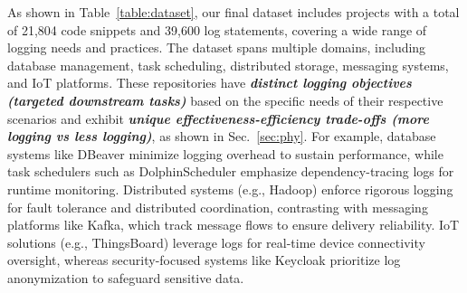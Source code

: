 As shown in Table~\ref{table:dataset}, our final dataset includes projects with a total of 21,804 code snippets and 39,600 log statements, covering a wide range of logging needs and practices.
The dataset spans multiple domains, including database management, task scheduling, distributed storage, messaging systems, and IoT platforms.
These repositories have \textit{\textbf{distinct logging objectives (targeted downstream tasks)}} based on the specific needs of their respective scenarios and exhibit \textit{\textbf{unique effectiveness-efficiency trade-offs (more logging vs less logging)}}, as shown in Sec.~\ref{sec:phy}.
For example, database systems like DBeaver minimize logging overhead to sustain performance, while task schedulers such as DolphinScheduler emphasize dependency-tracing logs for runtime monitoring. Distributed systems (e.g., Hadoop) enforce rigorous logging for fault tolerance and distributed coordination, contrasting with messaging platforms like Kafka, which track message flows to ensure delivery reliability. IoT solutions (e.g., ThingsBoard) leverage logs for real-time device connectivity oversight, whereas security-focused systems like Keycloak prioritize log anonymization to safeguard sensitive data.


